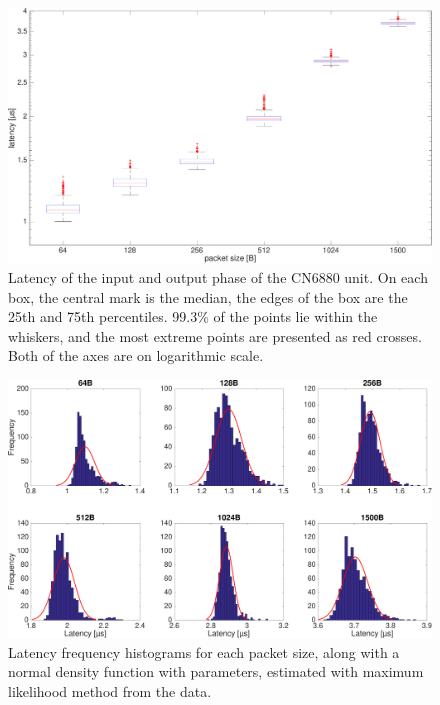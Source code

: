 \begin{figure}[]
  \begin{center}
    \includegraphics[width=\textwidth]{images/comm-latency-boxplot.pdf}
    \caption{Latency of the input and output phase of the CN6880 unit. On each box, the central mark is the median, the edges of the box are the 25th and 75th percentiles. 99.3\% of the points lie within the whiskers, and the most extreme points are presented as red crosses. Both of the axes are on logarithmic scale.}
    \label{fig:comm-latency-boxplot}
  \end{center}
\end{figure}

\begin{figure}[]
  \begin{center}
    \includegraphics[width=\textwidth]{images/comm-latency-histograms.pdf}
    \caption{Latency frequency histograms for each packet size, along with a normal density function with parameters, estimated with maximum likelihood method from the data.}
    \label{fig:comm-latency-histograms}
  \end{center}
\end{figure}


